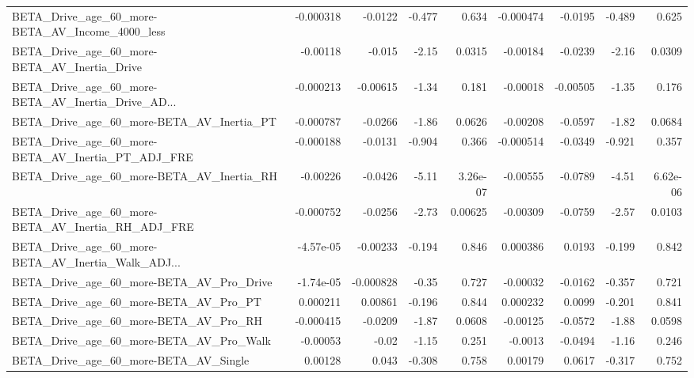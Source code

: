\begin{tabular}{lrrrrrrrr}
BETA\_Drive\_age\_60\_more-BETA\_AV\_Income\_4000\_less    &   -0.000318 &      -0.0122 &   -0.477 &    0.634 &  -0.000474 &     -0.0195 &       -0.489 &         0.625 \\
BETA\_Drive\_age\_60\_more-BETA\_AV\_Inertia\_Drive       &    -0.00118 &       -0.015 &    -2.15 &   0.0315 &   -0.00184 &     -0.0239 &        -2.16 &        0.0309 \\
BETA\_Drive\_age\_60\_more-BETA\_AV\_Inertia\_Drive\_AD... &   -0.000213 &     -0.00615 &    -1.34 &    0.181 &   -0.00018 &    -0.00505 &        -1.35 &         0.176 \\
BETA\_Drive\_age\_60\_more-BETA\_AV\_Inertia\_PT          &   -0.000787 &      -0.0266 &    -1.86 &   0.0626 &   -0.00208 &     -0.0597 &        -1.82 &        0.0684 \\
BETA\_Drive\_age\_60\_more-BETA\_AV\_Inertia\_PT\_ADJ\_FRE  &   -0.000188 &      -0.0131 &   -0.904 &    0.366 &  -0.000514 &     -0.0349 &       -0.921 &         0.357 \\
BETA\_Drive\_age\_60\_more-BETA\_AV\_Inertia\_RH          &    -0.00226 &      -0.0426 &    -5.11 & 3.26e-07 &   -0.00555 &     -0.0789 &        -4.51 &      6.62e-06 \\
BETA\_Drive\_age\_60\_more-BETA\_AV\_Inertia\_RH\_ADJ\_FRE  &   -0.000752 &      -0.0256 &    -2.73 &  0.00625 &   -0.00309 &     -0.0759 &        -2.57 &        0.0103 \\
BETA\_Drive\_age\_60\_more-BETA\_AV\_Inertia\_Walk\_ADJ... &   -4.57e-05 &     -0.00233 &   -0.194 &    0.846 &   0.000386 &      0.0193 &       -0.199 &         0.842 \\
BETA\_Drive\_age\_60\_more-BETA\_AV\_Pro\_Drive           &   -1.74e-05 &    -0.000828 &    -0.35 &    0.727 &   -0.00032 &     -0.0162 &       -0.357 &         0.721 \\
BETA\_Drive\_age\_60\_more-BETA\_AV\_Pro\_PT              &    0.000211 &      0.00861 &   -0.196 &    0.844 &   0.000232 &      0.0099 &       -0.201 &         0.841 \\
BETA\_Drive\_age\_60\_more-BETA\_AV\_Pro\_RH              &   -0.000415 &      -0.0209 &    -1.87 &   0.0608 &   -0.00125 &     -0.0572 &        -1.88 &        0.0598 \\
BETA\_Drive\_age\_60\_more-BETA\_AV\_Pro\_Walk            &    -0.00053 &        -0.02 &    -1.15 &    0.251 &    -0.0013 &     -0.0494 &        -1.16 &         0.246 \\
BETA\_Drive\_age\_60\_more-BETA\_AV\_Single              &     0.00128 &        0.043 &   -0.308 &    0.758 &    0.00179 &      0.0617 &       -0.317 &         0.752 \\

\end{tabular}
